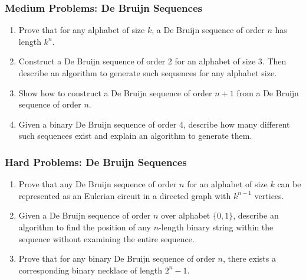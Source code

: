 \documentclass{article}
\theoremstyle{definition}
\begin{document}
\subsubsection{Medium Problems: De Bruijn Sequences}
\begin{enumerate}[resume]
    \item Prove that for any alphabet of size $k$, a De Bruijn sequence of order $n$ has length $k^n$.
    
    \item Construct a De Bruijn sequence of order 2 for an alphabet of size 3. Then describe an algorithm to generate such sequences for any alphabet size.
    
    \item Show how to construct a De Bruijn sequence of order $n+1$ from a De Bruijn sequence of order $n$.
    
    \item Given a binary De Bruijn sequence of order 4, describe how many different such sequences exist and explain an algorithm to generate them.
\end{enumerate}

\subsubsection{Hard Problems: De Bruijn Sequences}
\begin{enumerate}[resume]
    \item Prove that any De Bruijn sequence of order $n$ for an alphabet of size $k$ can be represented as an Eulerian circuit in a directed graph with $k^{n-1}$ vertices.
    
    \item Given a De Bruijn sequence of order $n$ over alphabet $\{0,1\}$, describe an algorithm to find the position of any $n$-length binary string within the sequence without examining the entire sequence.
    
    \item Prove that for any binary De Bruijn sequence of order $n$, there exists a corresponding binary necklace of length $2^n - 1$.
\end{enumerate}
\end{document}
